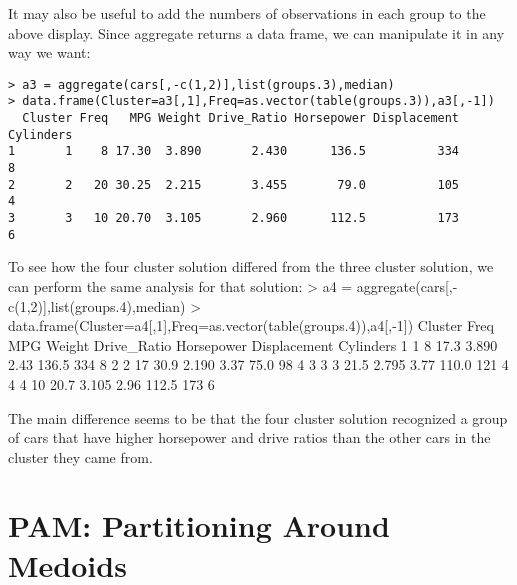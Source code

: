 {It may also be useful to add the numbers of observations in each group to the above display. Since aggregate returns a data frame, we can manipulate it in any way we want:
\begin{framed}
\begin{verbatim}
> a3 = aggregate(cars[,-c(1,2)],list(groups.3),median)
> data.frame(Cluster=a3[,1],Freq=as.vector(table(groups.3)),a3[,-1])
  Cluster Freq   MPG Weight Drive_Ratio Horsepower Displacement Cylinders
1       1    8 17.30  3.890       2.430      136.5          334         8
2       2   20 30.25  2.215       3.455       79.0          105         4
3       3   10 20.70  3.105       2.960      112.5          173         6
\end{verbatim}
\end{framed}
To see how the four cluster solution differed from the three cluster solution, we can perform the same analysis for that solution:
> a4 = aggregate(cars[,-c(1,2)],list(groups.4),median)
> data.frame(Cluster=a4[,1],Freq=as.vector(table(groups.4)),a4[,-1])
  Cluster Freq  MPG Weight Drive_Ratio Horsepower Displacement Cylinders
1       1    8 17.3  3.890        2.43      136.5          334         8
2       2   17 30.9  2.190        3.37       75.0           98         4
3       3    3 21.5  2.795        3.77      110.0          121         4
4       4   10 20.7  3.105        2.96      112.5          173         6


The main difference seems to be that the four cluster solution recognized a group of cars that have higher horsepower and drive ratios than the other cars in the cluster they came from.
\newpage
\section{PAM: Partitioning Around Medoids}

}
